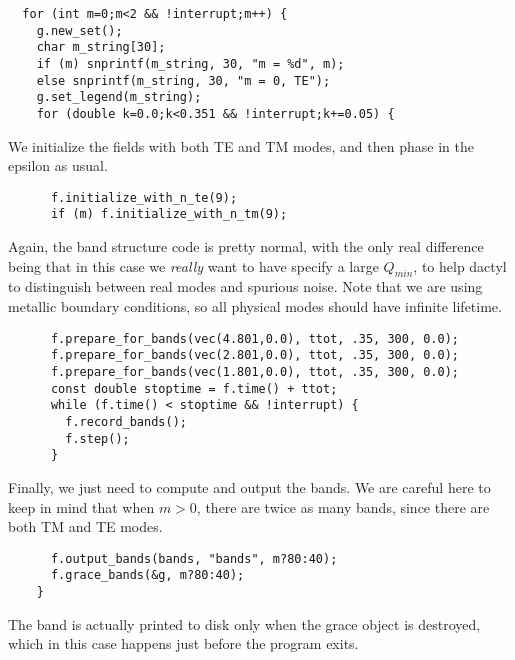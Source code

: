 \begin{verbatim}
  for (int m=0;m<2 && !interrupt;m++) {
    g.new_set();
    char m_string[30];
    if (m) snprintf(m_string, 30, "m = %d", m);
    else snprintf(m_string, 30, "m = 0, TE");
    g.set_legend(m_string);
    for (double k=0.0;k<0.351 && !interrupt;k+=0.05) {
\end{verbatim}
\begin{comment}
      printf("Working on k of %
      fields f(&vac, m);
      f.use_bloch(k);
      f.verbose(1);
      f.phase_in_material(&ma, 1000);
\end{comment}
We initialize the fields with both TE and TM modes, and then phase in the
epsilon as usual.
\begin{verbatim}
      f.initialize_with_n_te(9);
      if (m) f.initialize_with_n_tm(9);
\end{verbatim}
\begin{comment}
      while (f.is_phasing() && !interrupt) f.step();
\end{comment}
Again, the band structure code is pretty normal, with the only real
difference being that in this case we \emph{really} want to have specify a
large $Q_{min}$, to help dactyl to distinguish between real modes and
spurious noise.  Note that we are using metallic boundary conditions, so
all physical modes should have infinite lifetime.
\begin{verbatim}
      f.prepare_for_bands(vec(4.801,0.0), ttot, .35, 300, 0.0);
      f.prepare_for_bands(vec(2.801,0.0), ttot, .35, 300, 0.0);
      f.prepare_for_bands(vec(1.801,0.0), ttot, .35, 300, 0.0);
      const double stoptime = f.time() + ttot;
      while (f.time() < stoptime && !interrupt) {
        f.record_bands();
        f.step();
      }
\end{verbatim}
Finally, we just need to compute and output the bands.  We are careful here
to keep in mind that when $m > 0$, there are twice as many bands, since
there are both TM and TE modes.
\begin{verbatim}
      f.output_bands(bands, "bands", m?80:40);
      f.grace_bands(&g, m?80:40);
    }
\end{verbatim}
The band is actually printed to disk only when the grace object is
destroyed, which in this case happens just before the program exits.
\begin{comment}
  }
}
\end{comment}
